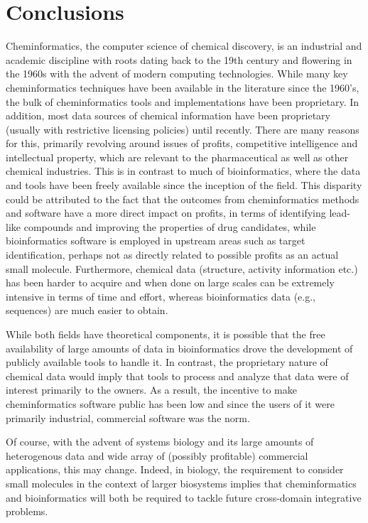\documentclass{sig-alternate}
\begin{document}
\section{Conclusions}
\label{sec:conclusions}
Cheminformatics, the computer science of chemical discovery, is an
industrial and academic discipline with roots dating back to the 19th
century and flowering in the 1960s with the advent of modern computing
technologies. While many key cheminformatics techniques have been
available in the literature since the 1960's, the bulk of
cheminformatics tools and implementations have been proprietary. In
addition, most data sources of chemical information have been
proprietary (usually with restrictive licensing policies) until
recently. There are many reasons for this, primarily revolving around
issues of profits, competitive intelligence and intellectual property,
which are relevant to the pharmaceutical as well as other chemical
industries. This is in contrast to much of bioinformatics, where the
data and tools have been freely available since the inception of the
field. This disparity could be attributed to the fact that the
outcomes from cheminformatics methods and software have a more direct
impact on profits, in terms of identifying lead-like compounds and
improving the properties of drug candidates, while bioinformatics
software is employed in upstream areas such as target identification,
perhaps not as directly related to possible profits as an actual small
molecule. Furthermore, chemical data (structure, activity information
etc.) has been harder to acquire and when done on large scales can be
extremely intensive in terms of time and effort, whereas
bioinformatics data (e.g., sequences) are much easier to obtain.

While both fields have theoretical components, it is possible that the
free availability of large amounts of data in bioinformatics drove the
development of publicly available tools to handle it. In contrast, the
proprietary nature of chemical data would imply that tools to process
and analyze that data were of interest primarily to the owners. As a
result, the incentive to make cheminformatics software public has been
low and since the users of it were primarily industrial, commercial
software was the norm.

Of course, with the advent of systems biology and its large amounts of
heterogenous data and wide array of (possibly profitable) commercial
applications, this may change. Indeed, in biology, the
requirement to consider small molecules in the context of larger
biosystems implies that cheminformatics and bioinformatics will both
be required to tackle future cross-domain integrative problems.
\end{document}

